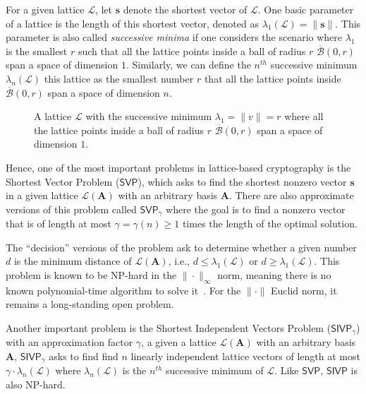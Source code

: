 \documentclass[cryptography,review,submit,pdftex,moreauthors,amsmath,amssymb,aps,strict]{Definitions/mdpi}
\begin{document}
For a given lattice $\mathcal{L}$, let $\mathbf{s}$ denote the shortest vector of $\mathcal{L}$. One basic parameter of a lattice is the length of this shortest vector, denoted as $\lambda_1(\mathcal{L}) = \|\mathbf{s}\|$. This parameter is also called \textit{successive minima} if one considers the scenario where $\lambda_1$ is the smallest $r$ such that all the lattice points inside a ball of radius $r$ $\overline{\mathcal{B}}(0,r)$ span a space of dimension $1$. Similarly, we can define the $n^{th}$ successive minimum $\lambda_n(\mathcal{L})$ this lattice as the smallest number $r$ that all the lattice points inside $\overline{\mathcal{B}}(0,r)$ span a space of dimension $n$. 


\begin{figure}[!htb]
    \centering
    
    \caption{A lattice $\mathcal{L}$ with the successive minimum $\lambda_1=\|v\|=r$ where all the lattice points inside a ball of radius $r$ $\overline{\mathcal{B}}(0,r)$ span a space of dimension $1$.}
    \label{fig:lattice_sucessive_minimum}
\end{figure}

Hence, one of the most important problems in lattice-based cryptography is the Shortest Vector Problem ($\mathsf{SVP}$), which asks to find the shortest nonzero vector $\mathbf{s}$ in a given lattice $\mathcal{L}(\mathbf{A})$ with an arbitrary basis $\mathbf{A}$. There are also approximate versions of this problem called $\mathsf{SVP}_{\gamma}$ where the goal is to find a nonzero vector that is of length at most $\gamma = \gamma(n)\geq 1$ times the length of the optimal solution.

The ``decision'' versions of the problem ask to determine whether a given number $d$ is the minimum distance of $\mathcal{L}(\mathbf{A})$, i.e., $d \leq \lambda_1(\mathcal{L})$ or $d \geq \lambda_1(\mathcal{L})$.
This problem is known to be NP-hard in the $\|\cdot\|_{\infty}$ norm, meaning there is no known polynomial-time algorithm to solve it~\cite{hardness_of_SVP}. For the $\|\cdot\|$ Euclid norm, it remains a long-standing open problem. 

Another important problem is the Shortest Independent Vectors Problem ($\mathsf{SIVP}_{\gamma}$) with an approximation factor $\gamma$, a given a lattice $\mathcal{L}(\mathbf{A})$ with an arbitrary basis $\mathbf{A}$, $\mathsf{SIVP}_{\gamma}$ asks to find find $n$ linearly independent lattice vectors of length at most $\gamma\cdot \lambda_{n}(\mathcal{L})$ where $\lambda_{n}(\mathcal{L})$ is the $n^{th}$ successive minimum of $\mathcal{L}$. Like $\mathsf{SVP}$, $\mathsf{SIVP}$ is also NP-hard.
\end{document}
